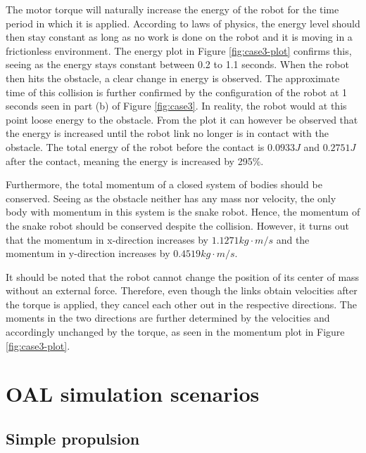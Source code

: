 The motor torque will naturally increase the energy of the robot for the time period in which it is applied. According to laws of physics, the energy level should then stay constant as long as no work is done on the robot and it is moving in a frictionless environment. The energy plot in Figure \ref{fig:case3-plot} confirms this, seeing as the energy stays constant between 0.2 to 1.1 seconds. When the robot then hits the obstacle, a clear change in energy is observed. The approximate time of this collision is further confirmed by the configuration of the robot at 1 seconds seen in part (b) of Figure \ref{fig:case3}.
In reality, the robot would at this point loose energy to the obstacle. From the plot it can however be observed that the energy is increased until the robot link no longer is in contact with the obstacle.
The total energy of the robot before the contact is $0.0933J$ and $0.2751J$ after the contact, meaning the energy is increased by 295\%.

Furthermore, the total momentum of a closed system of bodies should be conserved. Seeing as the obstacle neither has any mass nor velocity, the only body with momentum in this system is the snake robot. Hence, the momentum of the snake robot should be conserved despite the collision. However, it turns out that the momentum in x-direction increases by $1.1271kg\cdot m/s$ and the momentum in y-direction increases by $0.4519kg\cdot m/s$.

It should be noted that the robot cannot change the position of its center of mass without an external force. Therefore, even though the links obtain velocities after the torque is applied, they cancel each other out in the respective directions. The moments in the two directions are further determined by the velocities and accordingly unchanged by the torque, as seen in the momentum plot in Figure \ref{fig:case3-plot}.



\section{OAL simulation scenarios}

\subsection{Simple propulsion}\label{subseq:case21}

